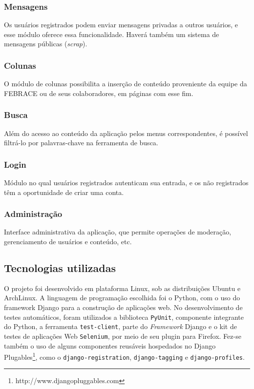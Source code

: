     \subsubsection{Mensagens}
      Os usuários registrados podem enviar mensagens privadas a outros usuários, e esse módulo oferece essa funcionalidade. Haverá também um sistema de mensagens públicas (\textit{scrap}).

    \subsubsection{Colunas}
      O módulo de colunas possibilita a inserção de conteúdo proveniente da equipe da FEBRACE ou de seus colaboradores, em páginas com esse fim.

    \subsubsection{Busca}
      Além do acesso ao conteúdo da aplicação pelos menus correspondentes, é possível filtrá-lo por palavras-chave na ferramenta de busca.

    \subsubsection{Login}
      Módulo no qual usuários registrados autenticam sua entrada, e os não registrados têm a oportunidade de criar uma conta.

    \subsubsection{Administração}
      Interface administrativa da aplicação, que permite operações de moderação, gerenciamento de usuários e conteúdo, etc.

  \subsection{Tecnologias utilizadas}\label{tecnologias}

    O projeto foi desenvolvido em plataforma Linux, sob as distribuições Ubuntu e ArchLinux. A linguagem de programação escolhida foi o Python, com o uso do framework Django para a construção de aplicações web. No desenvolvimento de testes automáticos, foram utilizados a biblioteca \texttt{PyUnit}, componente integrante do Python, a ferramenta \texttt{test-client}, parte do \textit{Framework} Django e o kit de testes de aplicações Web \texttt{Selenium}, por meio de seu plugin para Firefox. Fez-se também o uso de alguns componentes reusáveis hospedados no Django Plugables\footnote{http://www.djangopluggables.com}, como o \texttt{django-registration}, \texttt{django-tagging} e \texttt{django-profiles}.

